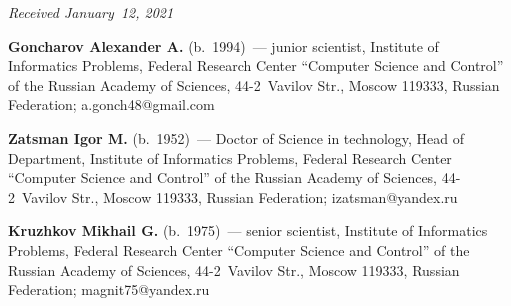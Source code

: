 \begin{multicols}{2}
{{ }
 }

\end{multicols}

\vspace*{-3pt}

  \hfill{\small\textit{Received January~12, 2021}}




\Contr

\noindent
\textbf{Goncharov Alexander A.} (b.\ 1994)~--- junior scientist, Institute of Informatics Problems, 
Federal Research Center ``Computer Science and Control'' of the Russian Academy of Sciences,  
44-2~Vavilov Str., Moscow 119333, Russian Federation; \mbox{a.gonch48@gmail.com}

\vspace*{3pt}

\noindent
\textbf{Zatsman Igor M.} (b.\ 1952)~--- Doctor of Science in technology, Head of Department, Institute 
of Informatics Problems, Federal Research Center ``Computer Science and Control'' of the Russian 
Academy of Sciences, 44-2~Vavilov Str., Moscow 119333, Russian Federation; 
\mbox{izatsman@yandex.ru}

\vspace*{3pt}

\noindent
\textbf{Kruzhkov Mikhail G.} (b.\ 1975)~--- senior scientist, Institute of Informatics Problems, Federal 
Research Center ``Computer Science and Control'' of the Russian Academy of Sciences, 44-2~Vavilov 
Str., Moscow 119333, Russian Federation; \mbox{magnit75@yandex.ru}

\label{end\stat}

\renewcommand{\bibname}{\protect\rm Литература}